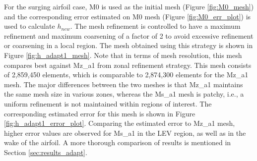 For the surging airfoil case, M0 is used as the initial mesh (Figure \ref{fig:M0_mesh}) and the corresponding error estimated on M0 mesh (Figure \ref{fig:M0_err_plot}) is used to calculate $h_{new}$. The mesh refinement is controlled to have a maximum refinement and maximum coarsening of a factor of 2 to avoid excessive refinement or coarsening in a local region. The mesh obtained using this strategy is shown in Figure \ref{fig:h_adapt1_mesh}. Note that in terms of mesh resolution, this mesh compares best against Mz\_a1 from zonal refinement strategy. This mesh consists of 2,859,450 elements, which is comparable to 2,874,300 elements for the Mz\_a1 mesh. The major differences between the two meshes is that Mz\_a1 maintains the same mesh size in various zones, whereas the Ms\_a1 mesh is patchy, i.e., a uniform refinement is not maintained within regions of interest.
The corresponding estimated error for this mesh is shown in Figure \ref{fig:h_adapt1_error_plot}. Comparing the estimated error to Mz\_a1 mesh, higher error values are observed for Ms\_a1 in the LEV region, as well as in the wake of the airfoil. A more thorough comparison of results is mentioned in Section \ref{sec:results_adapt}.
